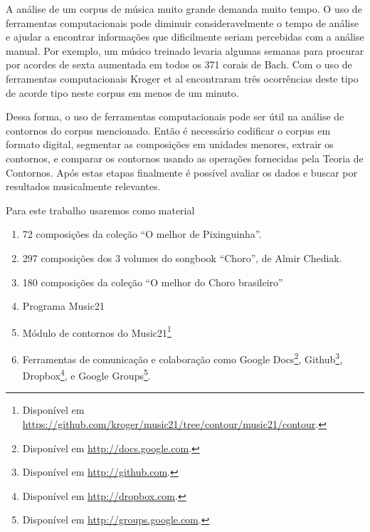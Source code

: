 \documentclass[11pt]{article}
\begin{document}

A análise de um corpus de música muito grande demanda muito tempo. O
uso de ferramentas computacionais pode diminuir consideravelmente o
tempo de análise e ajudar a encontrar informações que dificilmente
seriam percebidas com a análise manual. Por exemplo, um músico
treinado levaria algumas semanas para procurar por acordes de sexta
aumentada em todos os 371 corais de Bach. Com o uso de ferramentas
computacionais Kroger et al \cite{Kroger2008} encontraram três
ocorrências deste tipo de acorde tipo neste corpus em menos de um
minuto.

Dessa forma, o uso de ferramentas computacionais pode ser útil na
análise de contornos do corpus mencionado. Então é necessário
codificar o corpus em formato digital, segmentar as composições em
unidades menores, extrair os contornos, e comparar os contornos usando
as operações fornecidas pela Teoria de Contornos. Após estas etapas
finalmente é possível avaliar os dados e buscar por resultados
musicalmente relevantes.

Para este trabalho usaremos como material

\begin{enumerate}
\item 72 composições da coleção ``O melhor de Pixinguinha''.
\item 297 composições dos 3 volumes do songbook ``Choro'', de Almir
  Chediak.
\item 180 composições da coleção ``O melhor do Choro brasileiro''
\item Programa Music21
\item Módulo de contornos do Music21\footnote{Disponível em
    \url{https://github.com/kroger/music21/tree/contour/music21/contour}.}
\item Ferramentas de comunicação e colaboração como Google
  Docs\footnote{Disponível em \url{http://docs.google.com}.},
  Github\footnote{Disponível em \url{http://github.com}.},
  Dropbox\footnote{Disponível em \url{http://dropbox.com}.}, e Google
  Groups\footnote{Disponível em \url{http://groups.google.com}.}.
\end{enumerate}
\end{document}

